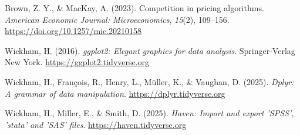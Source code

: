 \documentclass[
  man,
  longtable,
  nolmodern,
  notxfonts,
  notimes,
  colorlinks=true,linkcolor=blue,citecolor=blue,urlcolor=blue]{apa7}
\newlength{\cslhangindent}
\newenvironment{CSLReferences}[2] %
 {\begin{list}{}{%
  \setlength{\itemindent}{0pt}
  \setlength{\leftmargin}{0pt}
  \setlength{\parsep}{0pt}
  \ifodd #1
   \setlength{\leftmargin}{\cslhangindent}
   \setlength{\itemindent}{-1\cslhangindent}
  \fi
  \setlength{\itemsep}{#2\baselineskip}}}
 {\end{list}}
\begin{document}
\label{refs}
\begin{CSLReferences}{1}{0}
Brown, Z. Y., \& MacKay, A. (2023). Competition in pricing algorithms.
\emph{American Economic Journal: Microeconomics}, \emph{15}(2),
109--156. \url{https://doi.org/10.1257/mic.20210158}

Wickham, H. (2016). \emph{ggplot2: Elegant graphics for data analysis}.
Springer-Verlag New York. \url{https://ggplot2.tidyverse.org}

Wickham, H., François, R., Henry, L., Müller, K., \& Vaughan, D. (2025).
\emph{Dplyr: A grammar of data manipulation}.
\url{https://dplyr.tidyverse.org}

Wickham, H., Miller, E., \& Smith, D. (2025). \emph{Haven: Import and
export 'SPSS', 'stata' and 'SAS' files}.
\url{https://haven.tidyverse.org}

\end{CSLReferences}
\end{document}
